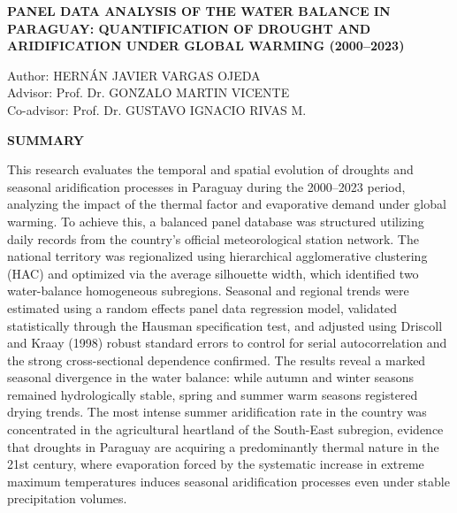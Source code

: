 \documentclass[12pt,a4paper,oneside]{book}
\begin{document}
\begin{center}
    {\fontsize{13pt}{16pt}\selectfont\bfseries PANEL DATA ANALYSIS OF THE WATER BALANCE IN PARAGUAY: QUANTIFICATION OF DROUGHT AND ARIDIFICATION UNDER GLOBAL WARMING (2000–2023)\par}
\end{center}

\vspace{0.4cm}

\begin{flushright}
    \fontsize{12pt}{15pt}\selectfont
    Author: HERNÁN JAVIER VARGAS OJEDA \\
    Advisor: Prof. Dr. GONZALO MARTIN VICENTE \\
    Co-advisor: Prof. Dr. GUSTAVO IGNACIO RIVAS M.
\end{flushright}

\vspace{0.5cm}

\begin{flushleft}
    {\fontsize{13pt}{16pt}\selectfont\bfseries SUMMARY\par}
\end{flushleft}

\vspace{0.3cm}

\begingroup
\setlength{\parindent}{0pt}
\fontsize{12pt}{15pt}\selectfont\justifying
\noindent This research evaluates the temporal and spatial evolution of droughts and seasonal aridification processes in Paraguay during the 2000--2023 period, analyzing the impact of the thermal factor and evaporative demand under global warming. To achieve this, a balanced panel database was structured utilizing daily records from the country's official meteorological station network. The national territory was regionalized using hierarchical agglomerative clustering (HAC) and optimized via the average silhouette width, which identified two water-balance homogeneous subregions. Seasonal and regional trends were estimated using a random effects panel data regression model, validated statistically through the Hausman specification test, and adjusted using Driscoll and Kraay (1998) robust standard errors to control for serial autocorrelation and the strong cross-sectional dependence confirmed. The results reveal a marked seasonal divergence in the water balance: while autumn and winter seasons remained hydrologically stable, spring and summer warm seasons registered drying trends. The most intense summer aridification rate in the country was concentrated in the agricultural heartland of the South-East subregion, evidence that droughts in Paraguay are acquiring a predominantly thermal nature in the 21st century, where evaporation forced by the systematic increase in extreme maximum temperatures induces seasonal aridification processes even under stable precipitation volumes.\par
\end{document}
